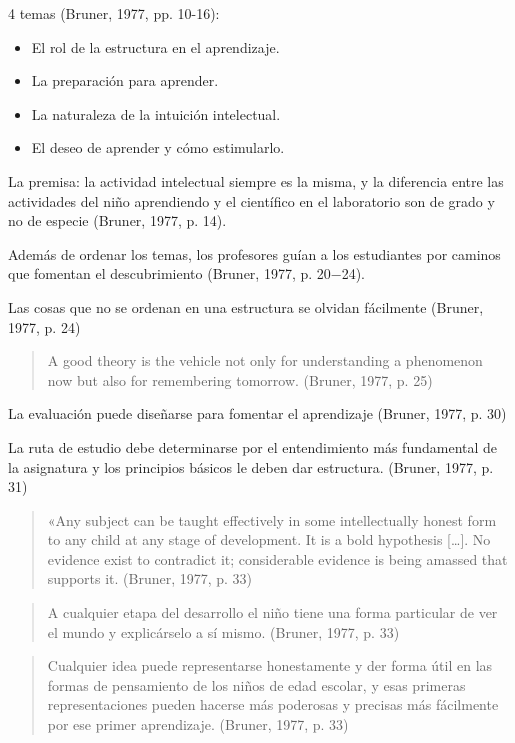 \documentclass[
  12,
]{scrartcl}
\providecommand{\tightlist}{%
  \setlength{\itemsep}{0pt}\setlength{\parskip}{0pt}}
\begin{document}
4 temas (Bruner, 1977, pp. 10-16):

\begin{itemize}
\tightlist
\item
  El rol de la estructura en el aprendizaje.
\item
  La preparación para aprender.
\item
  La naturaleza de la intuición intelectual.
\item
  El deseo de aprender y cómo estimularlo.
\end{itemize}

La premisa: la actividad intelectual siempre es la misma, y la
diferencia entre las actividades del niño aprendiendo y el científico en
el laboratorio son de grado y no de especie (Bruner, 1977, p. 14).

Además de ordenar los temas, los profesores guían a los estudiantes por
caminos que fomentan el descubrimiento (Bruner, 1977, p. 20−24).

Las cosas que no se ordenan en una estructura se olvidan fácilmente
(Bruner, 1977, p. 24)

\begin{quote}
A good theory is the vehicle not only for understanding a phenomenon now
but also for remembering tomorrow. (Bruner, 1977, p. 25)
\end{quote}

La evaluación puede diseñarse para fomentar el aprendizaje (Bruner,
1977, p. 30)

La ruta de estudio debe determinarse por el entendimiento más
fundamental de la asignatura y los principios básicos le deben dar
estructura. (Bruner, 1977, p. 31)

\begin{quote}
«Any subject can be taught effectively in some intellectually honest
form to any child at any stage of development. It is a bold hypothesis
{[}\ldots{]}. No evidence exist to contradict it; considerable evidence
is being amassed that supports it. (Bruner, 1977, p. 33)
\end{quote}

\begin{quote}
A cualquier etapa del desarrollo el niño tiene una forma particular de
ver el mundo y explicárselo a sí mismo. (Bruner, 1977, p. 33)
\end{quote}

\begin{quote}
Cualquier idea puede representarse honestamente y der forma útil en las
formas de pensamiento de los niños de edad escolar, y esas primeras
representaciones pueden hacerse más poderosas y precisas más fácilmente
por ese primer aprendizaje. (Bruner, 1977, p. 33)
\end{quote}
\end{document}
